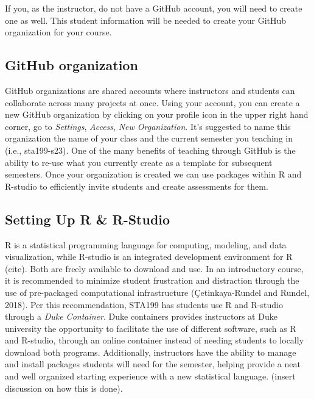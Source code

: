 \documentclass[
  12pt]{article}
\begin{document}
If you, as the instructor, do not have a GitHub account, you will need
to create one as well. This student information will be needed to create
your GitHub organization for your course.

\hypertarget{github-organization}{%
\subsection{GitHub organization}\label{github-organization}}

GitHub organizations are shared accounts where instructors and students
can collaborate across many projects at once. Using your account, you
can create a new GitHub organization by clicking on your profile icon in
the upper right hand corner, go to \emph{Settings}, \emph{Access},
\emph{New Organization}. It's suggested to name this organization the
name of your class and the current semester you teaching in (i.e.,
sta199-s23). One of the many benefits of teaching through GitHub is the
ability to re-use what you currently create as a template for subsequent
semesters. Once your organization is created we can use packages within
R and R-studio to efficiently invite students and create assessments for
them.

\hypertarget{setting-up-r-r-studio}{%
\subsection{Setting Up R \& R-Studio}\label{setting-up-r-r-studio}}

R is a statistical programming language for computing, modeling, and
data visualization, while R-studio is an integrated development
environment for R (cite). Both are freely available to download and use.
In an introductory course, it is recommended to minimize student
frustration and distraction through the use of pre-packaged
computational infrastructure (Çetinkaya-Rundel and Rundel, 2018). Per
this recommendation, STA199 has students use R and R-studio through a
\emph{Duke Container}. Duke containers provides instructors at Duke
university the opportunity to facilitate the use of different software,
such as R and R-studio, through an online container instead of needing
students to locally download both programs. Additionally, instructors
have the ability to manage and install packages students will need for
the semester, helping provide a neat and well organized starting
experience with a new statistical language. (insert discussion on how
this is done).
\end{document}
